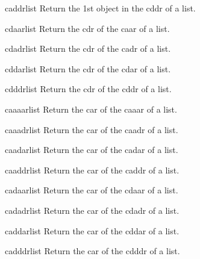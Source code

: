 \documentclass[10pt,english]{book}
\begin{document}
\begin{accessor}{caddr}{list}
  Return the 1st object in the cddr of a list.
\end{accessor}

\begin{accessor}{cdaar}{list}
  Return the cdr of the caar of a list.
\end{accessor}

\begin{accessor}{cdadr}{list}
  Return the cdr of the cadr of a list.
\end{accessor}

\begin{accessor}{cddar}{list}
  Return the cdr of the cdar of a list.
\end{accessor}

\begin{accessor}{cdddr}{list}
  Return the cdr of the cddr of a list.
\end{accessor}

\begin{accessor}{caaaar}{list}
  Return the car of the caaar of a list.
\end{accessor}

\begin{accessor}{caaadr}{list}
  Return the car of the caadr of a list.
\end{accessor}

\begin{accessor}{caadar}{list}
  Return the car of the cadar of a list.
\end{accessor}

\begin{accessor}{caaddr}{list}
  Return the car of the caddr of a list.
\end{accessor}

\begin{accessor}{cadaar}{list}
  Return the car of the cdaar of a list.
\end{accessor}

\begin{accessor}{cadadr}{list}
  Return the car of the cdadr of a list.
\end{accessor}

\begin{accessor}{caddar}{list}
  Return the car of the cddar of a list.
\end{accessor}

\begin{accessor}{cadddr}{list}
  Return the car of the cdddr of a list.
\end{accessor}
\end{document}
